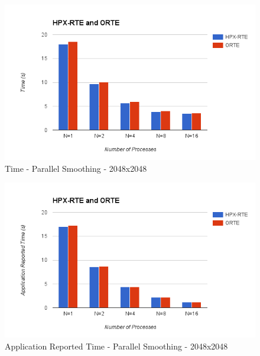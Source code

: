 \begin{figure}[h!]
\centering
\includegraphics[scale=0.7]{images/time-all-smoother-2048-infiniband.png}
\caption[Time - Parallel Smoothing - 2048x2048]{Time - Parallel Smoothing - 2048x2048}
\label{fig:time-all-smoother-2048-infiniband}
\end{figure}

\begin{figure}[h!]
\centering
\includegraphics[scale=0.7]{images/time-app-smoother-2048-infiniband.png}
\caption[Application Reported Time - Parallel Smoothing - 2048x2048]{Application Reported Time - Parallel Smoothing - 2048x2048}
\label{fig:time-app-smoother-2048-infiniband}
\end{figure}

